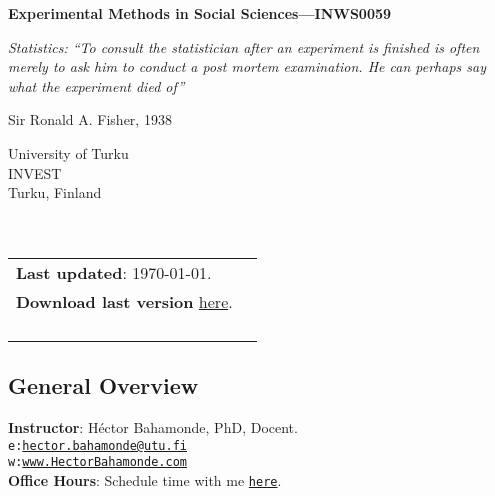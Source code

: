 \documentclass[letterpaper]{article}
\def\name{Experimental Methods in Social Sciences---INWS0059}
\begin{document}

\centerline{\huge \bf \name}

\epigraph{\emph{Statistics: ``To consult the statistician after an experiment is finished is often merely to ask him to conduct a post mortem examination. He can perhaps say what the experiment died of''}}{Sir Ronald A. Fisher, 1938}


\vspace{0.25in}

\begin{minipage}{0.45\linewidth}
 University of Turku \\
  INVEST \\
  Turku, Finland\\
  \\
  \\

\end{minipage}
\hspace{4cm}\begin{minipage}{0.45\linewidth}
  \begin{tabular}{ll}
{\bf Last updated}: \today. \\
 {\bf Download last version} \href{https://github.com/hbahamonde/Exp_Soc_Science/raw/main/Bahamonde_Exp_Soc_Sci.pdf}{here}.%
    \\
    \\
    \\
    \\
    \\
  \end{tabular}
\end{minipage}

\subsection*{General Overview}


\vspace{1mm}
{\bf Instructor}: H\'ector Bahamonde, PhD, Docent.\\
\texttt{e:}\href{mailto:hector.bahamonde@utu.fi}{\texttt{hector.bahamonde@utu.fi}}\\
\texttt{w:}\href{http://www.hectorbahamonde.com}{\texttt{www.HectorBahamonde.com}}\\
{\bf Office Hours}: Schedule time with me \href{https://calendly.com/bahamonde}{\texttt{here}}.\\
\end{document}

